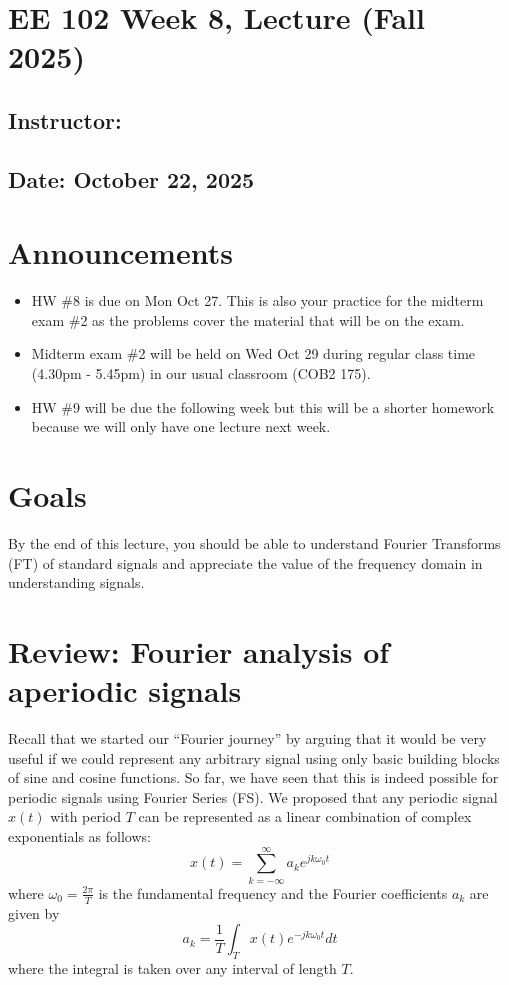\documentclass{ee102_notes}
\renewcommand{\releasedate}{October 22, 2025}
\begin{document}
\section*{EE 102 Week 8, Lecture  (Fall 2025)}
\subsection*{Instructor: \instructor}
\subsection*{Date: \releasedate}
\section{Announcements}
\begin{itemize}
    \item HW \#8 is due on Mon Oct 27. This is also your practice for the midterm exam \#2 as the problems cover the material that will be on the exam.
    \item Midterm exam \#2 will be held on Wed Oct 29 during regular class time (4.30pm - 5.45pm) in our usual classroom (COB2 175).
    \item HW \#9 will be due the following week but this will be a shorter homework because we will only have one lecture next week.
\end{itemize}
\section{Goals}

By the end of this lecture, you should be able to understand Fourier Transforms (FT) of standard signals and appreciate the value of the frequency domain in understanding signals.

\section{Review: Fourier analysis of aperiodic signals}
Recall that we started our ``Fourier journey'' by arguing that it would be very useful if we could represent any arbitrary signal using only basic building blocks of sine and cosine functions. So far, we have seen that this is indeed possible for periodic signals using Fourier Series (FS). We proposed that any periodic signal $x(t)$ with period $T$ can be represented as a linear combination of complex exponentials as follows:
\begin{equation} 
  \label{eq:fs_synthesis}
  x(t) = \sum_{k=-\infty}^{\infty} a_k e^{jk\omega_0 t}
\end{equation}
where $\omega_0 = \frac{2\pi}{T}$ is the fundamental frequency and the Fourier coefficients $a_k$ are given by
\begin{equation}
  \label{eq:fs_analysis}
  a_k = \frac{1}{T} \int_{T} x(t) e^{-jk\omega_0 t} dt
\end{equation}
where the integral is taken over any interval of length $T$.
\end{document}
